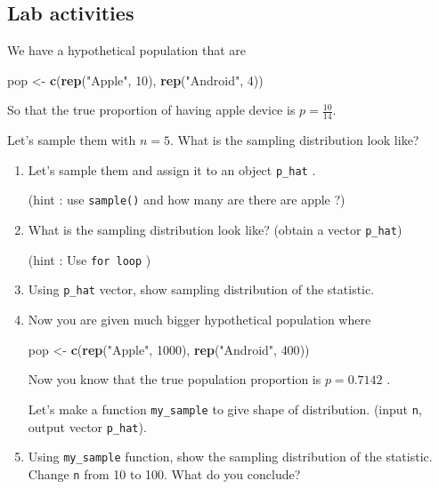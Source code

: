\documentclass[
]{article}
\newenvironment{Shaded}{\begin{snugshade}}{\end{snugshade}}
\newcommand{\DecValTok}[1]{\textcolor[rgb]{0.00,0.00,0.81}{#1}}
\newcommand{\FunctionTok}[1]{\textcolor[rgb]{0.13,0.29,0.53}{\textbf{#1}}}
\newcommand{\NormalTok}[1]{#1}
\newcommand{\OtherTok}[1]{\textcolor[rgb]{0.56,0.35,0.01}{#1}}
\newcommand{\StringTok}[1]{\textcolor[rgb]{0.31,0.60,0.02}{#1}}
\begin{document}
\subsection{Lab activities}\label{lab-activities}

We have a hypothetical population that are

\begin{Shaded}
\begin{Highlighting}[]
\NormalTok{pop }\OtherTok{\textless{}{-}} \FunctionTok{c}\NormalTok{(}\FunctionTok{rep}\NormalTok{(}\StringTok{"Apple"}\NormalTok{, }\DecValTok{10}\NormalTok{), }\FunctionTok{rep}\NormalTok{(}\StringTok{"Android"}\NormalTok{, }\DecValTok{4}\NormalTok{))}
\end{Highlighting}
\end{Shaded}

So that the true proportion of having apple device is
\(p=\frac{10}{14}\).

Let's sample them with \(n=5\). What is the sampling distribution look
like?

\begin{enumerate}
\def\labelenumi{\arabic{enumi}.}
\item
  Let's sample them and assign it to an object \texttt{p\_hat} .

  (hint : use \texttt{sample()} and how many are there are apple ?)
\item
  What is the sampling distribution look like? (obtain a vector
  \texttt{p\_hat})

  (hint : Use \texttt{for\ loop} )
\item
  Using \texttt{p\_hat} vector, show sampling distribution of the
  statistic.
\item
  Now you are given much bigger hypothetical population where

\begin{Shaded}
\begin{Highlighting}[]
\NormalTok{pop }\OtherTok{\textless{}{-}} \FunctionTok{c}\NormalTok{(}\FunctionTok{rep}\NormalTok{(}\StringTok{"Apple"}\NormalTok{, }\DecValTok{1000}\NormalTok{), }\FunctionTok{rep}\NormalTok{(}\StringTok{"Android"}\NormalTok{, }\DecValTok{400}\NormalTok{))}
\end{Highlighting}
\end{Shaded}

  Now you know that the true population proportion is \(p=0.7142\) .

  Let's make a function \texttt{my\_sample} to give shape of
  distribution. (input \texttt{n}, output vector \texttt{p\_hat}).
\item
  Using \texttt{my\_sample} function, show the sampling distribution of
  the statistic. Change \texttt{n} from 10 to 100. What do you conclude?
\end{enumerate}
\end{document}
